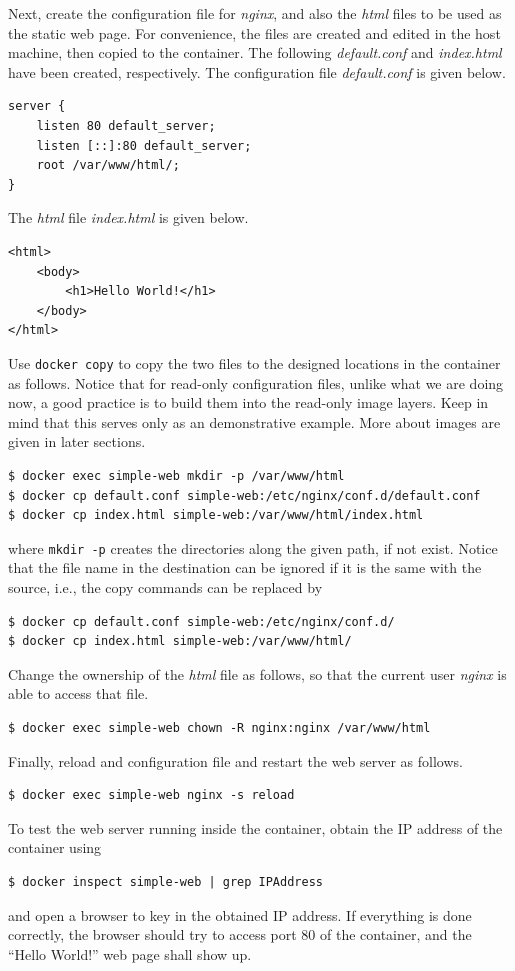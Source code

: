 Next, create the configuration file for \textit{nginx}, and also the \textit{html} files to be used as the static web page. For convenience, the files are created and edited in the host machine, then copied to the container. The following \textit{default.conf} and \textit{index.html} have been created, respectively. The configuration file \textit{default.conf} is given below.
\begin{lstlisting}
server {
	listen 80 default_server;
	listen [::]:80 default_server;
	root /var/www/html/;
}
\end{lstlisting}
The \textit{html} file \textit{index.html} is given below.
\begin{lstlisting}
<html>
	<body>
		<h1>Hello World!</h1>
	</body>
</html>
\end{lstlisting}
Use \verb|docker copy| to copy the two files to the designed locations in the container as follows. Notice that for read-only configuration files, unlike what we are doing now, a good practice is to build them into the read-only image layers. Keep in mind that this serves only as an demonstrative example. More about images are given in later sections.
\begin{lstlisting}
$ docker exec simple-web mkdir -p /var/www/html
$ docker cp default.conf simple-web:/etc/nginx/conf.d/default.conf
$ docker cp index.html simple-web:/var/www/html/index.html
\end{lstlisting}
where \verb|mkdir -p| creates the directories along the given path, if not exist. Notice that the file name in the destination can be ignored if it is the same with the source, i.e., the copy commands can be replaced by
\begin{lstlisting}
$ docker cp default.conf simple-web:/etc/nginx/conf.d/
$ docker cp index.html simple-web:/var/www/html/
\end{lstlisting}

Change the ownership of the \textit{html} file as follows, so that the current user \textit{nginx} is able to access that file.
\begin{lstlisting}
$ docker exec simple-web chown -R nginx:nginx /var/www/html
\end{lstlisting}

Finally, reload and configuration file and restart the web server as follows.
\begin{lstlisting}
$ docker exec simple-web nginx -s reload
\end{lstlisting}

To test the web server running inside the container, obtain the IP address of the container using
\begin{lstlisting}
$ docker inspect simple-web | grep IPAddress
\end{lstlisting}
and open a browser to key in the obtained IP address. If everything is done correctly, the browser should try to access port 80 of the container, and the ``Hello World!'' web page shall show up.

